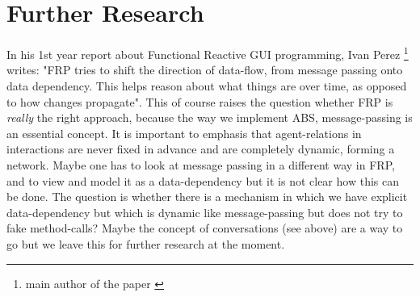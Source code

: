 
\section{Further Research}
In his 1st year report about Functional Reactive GUI programming, Ivan Perez \footnote{main author of the paper \cite{perez_functional_2016}} writes: "FRP tries to shift the direction of data-flow, from message passing onto data dependency. This helps reason about what things are over time, as opposed to how changes propagate". This of course raises the question whether FRP is \textit{really} the right approach, because the way we implement ABS, message-passing is an essential concept. It is important to emphasis that agent-relations in interactions are never fixed in advance and are completely dynamic, forming a network. Maybe one has to look at message passing in a different way in FRP, and to view and model it as a data-dependency but it is not clear how this can be done. The question is whether there is a mechanism in which we have explicit data-dependency but which is dynamic like message-passing but does not try to fake method-calls? Maybe the concept of conversations (see above) are a way to go but we leave this for further research at the moment.